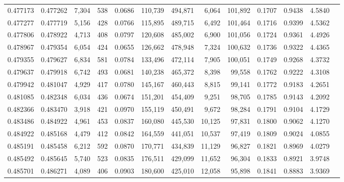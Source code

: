 \begin{tabular}{rrrrrrrrrrrrr}
0.477173 & 0.477262 &  7,304 &   538 &                                     0.0686 & 110,739 & 494,871 &   6,064 & 101,892 & 0.1707 & 0.9438 & 4.5840 \\
0.477277 & 0.477719 &  5,156 &   428 &                                     0.0766 & 115,895 & 489,715 &   6,492 & 101,464 & 0.1716 & 0.9399 & 4.5362 \\
0.477806 & 0.478922 &  4,713 &   408 &                                     0.0797 & 120,608 & 485,002 &   6,900 & 101,056 & 0.1724 & 0.9361 & 4.4926 \\
0.478967 & 0.479354 &  6,054 &   424 &                                     0.0655 & 126,662 & 478,948 &   7,324 & 100,632 & 0.1736 & 0.9322 & 4.4365 \\
0.479355 & 0.479627 &  6,834 &   581 &                                     0.0784 & 133,496 & 472,114 &   7,905 & 100,051 & 0.1749 & 0.9268 & 4.3732 \\
0.479637 & 0.479918 &  6,742 &   493 &                                     0.0681 & 140,238 & 465,372 &   8,398 &  99,558 & 0.1762 & 0.9222 & 4.3108 \\
0.479942 & 0.481047 &  4,929 &   417 &                                     0.0780 & 145,167 & 460,443 &   8,815 &  99,141 & 0.1772 & 0.9183 & 4.2651 \\
0.481085 & 0.482348 &  6,034 &   436 &                                     0.0674 & 151,201 & 454,409 &   9,251 &  98,705 & 0.1785 & 0.9143 & 4.2092 \\
0.482366 & 0.483470 &  3,918 &   421 &                                     0.0970 & 155,119 & 450,491 &   9,672 &  98,284 & 0.1791 & 0.9104 & 4.1729 \\
0.483486 & 0.484922 &  4,961 &   453 &                                     0.0837 & 160,080 & 445,530 &  10,125 &  97,831 & 0.1800 & 0.9062 & 4.1270 \\
0.484922 & 0.485168 &  4,479 &   412 &                                     0.0842 & 164,559 & 441,051 &  10,537 &  97,419 & 0.1809 & 0.9024 & 4.0855 \\
0.485191 & 0.485458 &  6,212 &   592 &                                     0.0870 & 170,771 & 434,839 &  11,129 &  96,827 & 0.1821 & 0.8969 & 4.0279 \\
0.485492 & 0.485645 &  5,740 &   523 &                                     0.0835 & 176,511 & 429,099 &  11,652 &  96,304 & 0.1833 & 0.8921 & 3.9748 \\
0.485701 & 0.486271 &  4,089 &   406 &                                     0.0903 & 180,600 & 425,010 &  12,058 &  95,898 & 0.1841 & 0.8883 & 3.9369 \\

\end{tabular}
